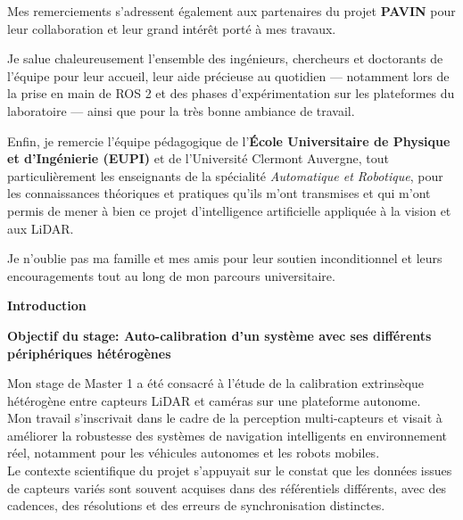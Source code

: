 \documentclass[12pt,a4paper,oneside]{report}
\begin{document}
Mes remerciements s'adressent également aux partenaires du projet \textbf{PAVIN} pour leur collaboration et leur grand intérêt porté à mes travaux.\vspace{0.5cm}

Je salue chaleureusement l'ensemble des ingénieurs, chercheurs et doctorants de l'équipe pour leur accueil, leur aide précieuse au quotidien — notamment lors de la prise en main de ROS 2 et des phases d'expérimentation sur les plateformes du laboratoire — ainsi que pour la très bonne ambiance de travail.\vspace{1cm}

Enfin, je remercie l'équipe pédagogique de l'\textbf{École Universitaire de Physique et d'Ingénierie (EUPI)} et de l'Université Clermont Auvergne, tout particulièrement les enseignants de la spécialité \textit{Automatique et Robotique}, pour les connaissances théoriques et pratiques qu'ils m'ont transmises et qui m'ont permis de mener à bien ce projet d'intelligence artificielle appliquée à la vision et aux LiDAR.\vspace{1cm}

Je n'oublie pas ma famille et mes amis pour leur soutien inconditionnel et leurs encouragements tout au long de mon parcours universitaire.\vspace{0.5cm}


\newpage

\begin{center}
    {\Huge\bfseries Introduction}\par
    \vspace{0.5cm}
    {\Large\bfseries Objectif du stage: Auto-calibration d'un système avec ses différents périphériques hétérogènes}
\end{center}
\thispagestyle{empty} %

\bigskip

\hspace*{1cm}Mon stage de Master 1 a été consacré à l'étude de la calibration extrinsèque hétérogène entre capteurs LiDAR et caméras sur une plateforme autonome.\\

\hspace*{1cm}Mon travail s'inscrivait dans le cadre de la perception multi-capteurs et visait à améliorer la robustesse des systèmes de navigation intelligents en environnement réel, notamment pour les véhicules autonomes et les robots mobiles. \\
\hspace*{1cm}Le contexte scientifique du projet s'appuyait sur le constat que les données issues de capteurs variés sont souvent acquises dans des référentiels différents, avec des cadences, des résolutions et des erreurs de synchronisation distinctes. \\
\end{document}
